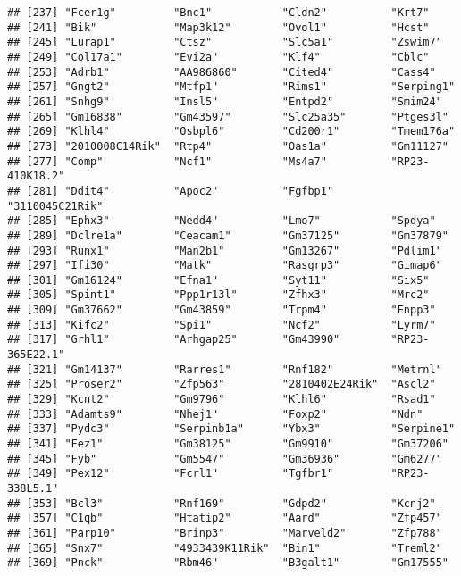 \documentclass[
]{article}
\begin{document}
\begin{verbatim}
## [237] "Fcer1g"         "Bnc1"           "Cldn2"          "Krt7"          
## [241] "Bik"            "Map3k12"        "Ovol1"          "Hcst"          
## [245] "Lurap1"         "Ctsz"           "Slc5a1"         "Zswim7"        
## [249] "Col17a1"        "Evi2a"          "Klf4"           "Cblc"          
## [253] "Adrb1"          "AA986860"       "Cited4"         "Cass4"         
## [257] "Gngt2"          "Mtfp1"          "Rims1"          "Serping1"      
## [261] "Snhg9"          "Insl5"          "Entpd2"         "Smim24"        
## [265] "Gm16838"        "Gm43597"        "Slc25a35"       "Ptges3l"       
## [269] "Klhl4"          "Osbpl6"         "Cd200r1"        "Tmem176a"      
## [273] "2010008C14Rik"  "Rtp4"           "Oas1a"          "Gm11127"       
## [277] "Comp"           "Ncf1"           "Ms4a7"          "RP23-410K18.2" 
## [281] "Ddit4"          "Apoc2"          "Fgfbp1"         "3110045C21Rik" 
## [285] "Ephx3"          "Nedd4"          "Lmo7"           "Spdya"         
## [289] "Dclre1a"        "Ceacam1"        "Gm37125"        "Gm37879"       
## [293] "Runx1"          "Man2b1"         "Gm13267"        "Pdlim1"        
## [297] "Ifi30"          "Matk"           "Rasgrp3"        "Gimap6"        
## [301] "Gm16124"        "Efna1"          "Syt11"          "Six5"          
## [305] "Spint1"         "Ppp1r13l"       "Zfhx3"          "Mrc2"          
## [309] "Gm37662"        "Gm43859"        "Trpm4"          "Enpp3"         
## [313] "Kifc2"          "Spi1"           "Ncf2"           "Lyrm7"         
## [317] "Grhl1"          "Arhgap25"       "Gm43990"        "RP23-365E22.1" 
## [321] "Gm14137"        "Rarres1"        "Rnf182"         "Metrnl"        
## [325] "Proser2"        "Zfp563"         "2810402E24Rik"  "Ascl2"         
## [329] "Kcnt2"          "Gm9796"         "Klhl6"          "Rsad1"         
## [333] "Adamts9"        "Nhej1"          "Foxp2"          "Ndn"           
## [337] "Pydc3"          "Serpinb1a"      "Ybx3"           "Serpine1"      
## [341] "Fez1"           "Gm38125"        "Gm9910"         "Gm37206"       
## [345] "Fyb"            "Gm5547"         "Gm36936"        "Gm6277"        
## [349] "Pex12"          "Fcrl1"          "Tgfbr1"         "RP23-338L5.1"  
## [353] "Bcl3"           "Rnf169"         "Gdpd2"          "Kcnj2"         
## [357] "C1qb"           "Htatip2"        "Aard"           "Zfp457"        
## [361] "Parp10"         "Brinp3"         "Marveld2"       "Zfp788"        
## [365] "Snx7"           "4933439K11Rik"  "Bin1"           "Treml2"        
## [369] "Pnck"           "Rbm46"          "B3galt1"        "Gm17555"       

\end{verbatim}
\end{document}
